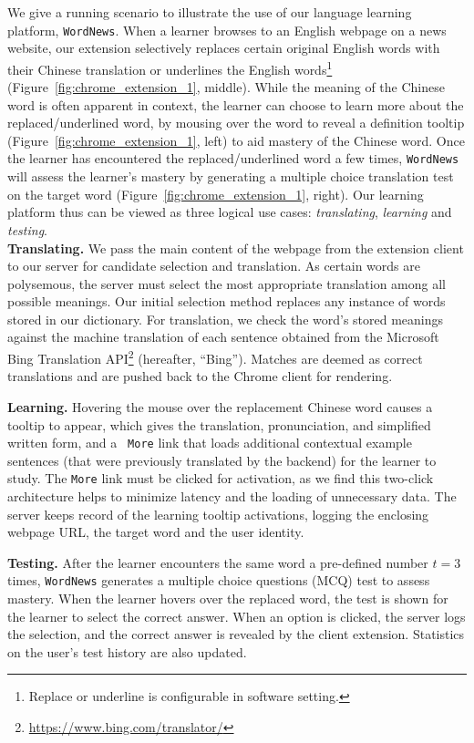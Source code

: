 \begin{CJK}{UTF8}{gbsn}
We give a running scenario to illustrate the use of our language
learning platform, {\tt WordNews}.  When a learner browses to an
English webpage on a news website, our extension selectively replaces
certain original English words with their Chinese translation 
or underlines the English words\footnote{Replace or underline is configurable
in software setting.} (Figure~\ref{fig:chrome_extension_1}, middle).  
While the meaning of
the Chinese word is often apparent in context, the learner can choose
to learn more about the replaced/underlined word, by mousing over the word
to reveal a definition tooltip (Figure~\ref{fig:chrome_extension_1},
left) to aid mastery of the Chinese word.  Once the learner has
encountered the replaced/underlined word a few times, {\tt WordNews} will assess
the learner's mastery by generating a multiple choice translation test
on the target word (Figure~\ref{fig:chrome_extension_1}, right). Our
learning platform thus can be viewed as three logical use cases:
{\it translating}, {\it learning} and {\it testing}. \\

{\bf Translating.}  We pass the main content of the webpage from the
extension client to our server for candidate selection and
translation.  As certain words are polysemous, the server must select
the most appropriate translation among all possible meanings. Our
initial selection method replaces any instance of words stored in our
dictionary. For translation, we check the word's stored meanings
against the machine translation of each sentence obtained from the
Microsoft Bing Translation API\footnote{\url{https://www.bing.com/translator/}} 
(hereafter, ``Bing'').  Matches are
deemed as correct translations and are pushed back to the Chrome
client for rendering.


{\bf Learning.} Hovering the mouse over the replacement Chinese word
causes a tooltip to appear, which gives the translation,
pronunciation, and simplified written form, and a {\tt
  More} link that loads additional contextual example sentences (that
were previously translated by the backend) for the learner to study.
The  {\tt More}  link must be clicked for activation, as we find this
two-click architecture helps to minimize latency and the loading of
unnecessary data.  The server keeps record of the learning tooltip
activations, logging the enclosing webpage URL, the target word and
the user identity.

{\bf Testing.}  After the learner encounters the same word a
pre-defined number $t=3$ times, {\tt WordNews} generates a multiple choice questions (MCQ) test
to assess mastery.  When the learner hovers over the replaced word,
the test is shown for the learner to select the correct answer. When
an option is clicked, the server logs the selection, and the correct
answer is revealed by the client extension.  Statistics on the user's
test history are also updated.


\end{CJK}
